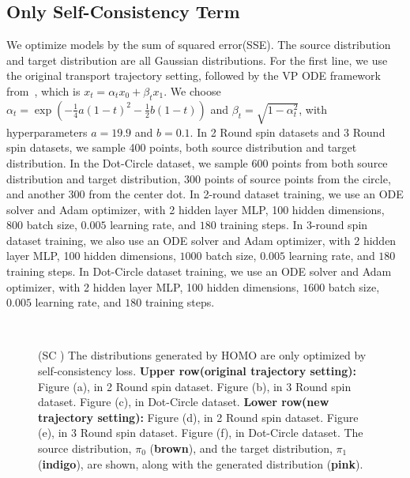 \subsection{Only Self-Consistency Term}\label{sec:app:3rd_self_consistency}
We optimize models by the sum of squared error(SSE). The source distribution and target distribution are all Gaussian distributions. For the first line, we use the original transport trajectory setting, followed by the VP ODE framework from~\cite{rectified_flow}, which is $x_t = \alpha_t x_0 + \beta_t x_1$. We choose $\alpha_t = \exp(-\frac{1}{4} a(1-t)^2 - \frac{1}{2} b(1-t))$ and $\beta_t = \sqrt{1 - \alpha_t^2}$, with hyperparameters $a = 19.9$ and $b = 0.1$. In 2 Round spin datasets and 3 Round spin datasets, we sample 400 points, both source distribution and target distribution. In the Dot-Circle dataset, we sample 600 points from both source distribution and target distribution, 300 points of source points from the circle, and another 300 from the center dot. In 2-round dataset training, we use an ODE solver and Adam optimizer, with 2 hidden layer MLP, 100 hidden dimensions, $800$ batch size, $0.005$ learning rate, and $180$ training steps. In 3-round spin dataset training, we also use an ODE solver and Adam optimizer, with 2 hidden layer MLP, 100 hidden dimensions, $1000$ batch size, $0.005$ learning rate, and $180$ training steps. In Dot-Circle dataset training, we use an ODE solver and Adam optimizer, with 2 hidden layer MLP, 100 hidden dimensions, $1600$ batch size, $0.005$ learning rate, and $180$ training steps. 
\begin{figure}[!ht]
\centering
{}
 \\
\caption{
(SC )
The distributions generated by HOMO are only optimized by self-consistency loss. 
\textbf{Upper row(original trajectory setting):}
Figure (a), in 2 Round spin dataset. Figure (b), in 3 Round spin dataset. 
Figure (c), in Dot-Circle dataset. 
\textbf{Lower row(new trajectory setting):}
Figure (d), in 2 Round spin dataset. 
Figure (e), in 3 Round spin dataset. 
Figure (f), in Dot-Circle dataset. 
The source distribution, $\pi_0$ ({\textbf{brown}}), and the target distribution, $\pi_1$ ({\textbf{indigo}}), are shown, along with the generated distribution ({\textbf{pink}}). 
}
\label{fig:3rd_self_consistency}
\end{figure}

